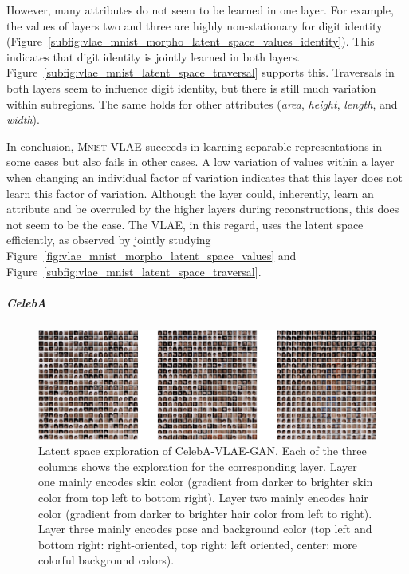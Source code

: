 However, many attributes do not seem to be learned in one layer.
For example, the values of layers two and three are highly non-stationary for digit identity (Figure~\ref{subfig:vlae_mnist_morpho_latent_space_values_identity}).
This indicates that digit identity is jointly learned in both layers.
Figure~\ref{subfig:vlae_mnist_latent_space_traversal} supports this.
Traversals in both layers seem to influence digit identity, but there is still much variation within subregions.
The same holds for other attributes (\textit{area}, \textit{height}, \textit{length}, and \textit{width}).

In conclusion, \textsc{Mnist}-\ac{VLAE} succeeds in learning separable representations in some cases but also fails in other cases.
A low variation of values within a layer when changing an individual factor of variation indicates that this layer does not learn this factor of variation.
Although the layer could, inherently, learn an attribute and be overruled by the higher layers during reconstructions, this does not seem to be the case.
The \ac{VLAE}, in this regard, uses the latent space efficiently, as observed by jointly studying Figure~\ref{fig:vlae_mnist_morpho_latent_space_values} and Figure~\ref{subfig:vlae_mnist_latent_space_traversal}.

\subparagraph{CelebA}

\begin{figure}
    \centering
    \includegraphics[width=\textwidth]{images/latent_space_traversals/vlae_gan_celeba.png}
    \caption[VLAE-GAN on CelebA: Latent Space Exploration]{Latent space exploration of CelebA-VLAE-GAN. Each of the three columns shows the exploration for the corresponding layer. Layer one mainly encodes skin color (gradient from darker to brighter skin color from top left to bottom right). Layer two mainly encodes hair color (gradient from darker to brighter hair color from left to right). Layer three mainly encodes pose and background color (top left and bottom right: right-oriented, top right: left oriented, center: more colorful background colors). }
    \label{fig:celeba_latent_space_traversal}
\end{figure}


